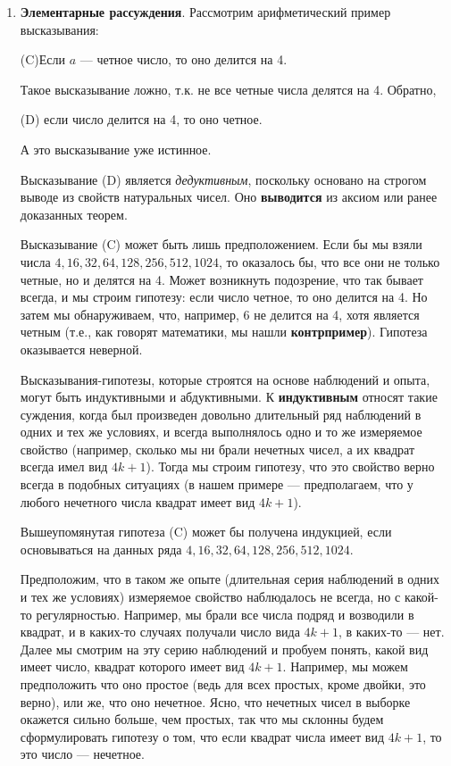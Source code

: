 \begin{enumerate}
\item \textbf{Элементарные рассуждения}. Рассмотрим арифметический пример высказывания:
\begin{center}
(C)\quad Если $a$ --- четное число, то оно делится на 4.
\end{center}
Такое высказывание ложно, т.к. не все четные числа делятся на 4. Обратно,
\begin{center}
(D) если число делится на 4, то оно четное.
\end{center}
А это высказывание уже истинное.

Высказывание (D) является \textit{дедуктивным}, поскольку основано на строгом выводе из свойств натуральных чисел. Оно \textbf{выводится} из аксиом или ранее доказанных теорем.

Высказывание (C) может быть лишь предположением. Если бы мы взяли числа $4,16,32,64,128,256,512,1024$, то оказалось бы, что все они не только четные, но и делятся на 4. Может возникнуть подозрение, что так бывает всегда, и мы строим гипотезу: если число четное, то оно делится на 4. Но затем мы обнаруживаем, что, например, 6 не делится на 4, хотя является четным (т.е., как говорят математики, мы нашли \textbf{контрпример}). Гипотеза оказывается неверной.

Высказывания-гипотезы, которые строятся на основе наблюдений и опыта, могут быть индуктивными и абдуктивными. К \textbf{индуктивным} относят такие суждения, когда был произведен довольно длительный ряд наблюдений в одних и тех же условиях, и всегда выполнялось одно и то же измеряемое свойство (например, сколько мы ни брали нечетных чисел, а их квадрат всегда имел вид $4k+1$). Тогда мы строим гипотезу, что это свойство верно всегда в подобных ситуациях (в нашем примере --- предполагаем, что у любого нечетного числа квадрат имеет вид $4k+1$).

Вышеупомянутая гипотеза (C) может бы получена индукцией, если основываться на данных ряда $4,16,32,64,128,256,512,1024$.

Предположим, что в таком же опыте (длительная серия наблюдений в одних и тех же условиях) измеряемое свойство наблюдалось не всегда, но с какой-то регулярностью. Например, мы брали все числа подряд и возводили в квадрат, и в каких-то случаях получали число вида $4k+1$, в каких-то --- нет. Далее мы смотрим на эту серию наблюдений и пробуем понять, какой вид имеет число, квадрат которого имеет вид $4k+1$. Например, мы можем предположить что оно простое (ведь для всех простых, кроме двойки, это верно), или же, что оно нечетное. Ясно, что нечетных чисел в выборке окажется сильно больше, чем простых, так что мы склонны будем сформулировать гипотезу о том, что если квадрат числа имеет вид $4k+1$, то это число --- нечетное.


\end{enumerate}
